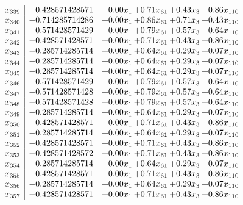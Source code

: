 \documentclass[8pt]{article}
\begin{document}
\[\begin{array}{c| c c@{\hskip 2pt} c@{\hskip 2pt} c@{\hskip 2pt} c@{\hskip 2pt} }
 x_{339}   &  -0.428571428571 & +  0.00 x_{1} & +  0.71 x_{61} & +  0.43 x_{3} & +  0.86 x_{110}\\
 x_{340}   &  -0.714285714286 & +  0.00 x_{1} & +  0.86 x_{61} & +  0.71 x_{3} & +  0.43 x_{110}\\
 x_{341}   &  -0.571428571429 & +  0.00 x_{1} & +  0.79 x_{61} & +  0.57 x_{3} & +  0.64 x_{110}\\
 x_{342}   &  -0.428571428571 & +  0.00 x_{1} & +  0.71 x_{61} & +  0.43 x_{3} & +  0.86 x_{110}\\
 x_{343}   &  -0.285714285714 & +  0.00 x_{1} & +  0.64 x_{61} & +  0.29 x_{3} & +  0.07 x_{110}\\
 x_{344}   &  -0.285714285714 & +  0.00 x_{1} & +  0.64 x_{61} & +  0.29 x_{3} & +  0.07 x_{110}\\
 x_{345}   &  -0.285714285714 & +  0.00 x_{1} & +  0.64 x_{61} & +  0.29 x_{3} & +  0.07 x_{110}\\
 x_{346}   &  -0.571428571429 & +  0.00 x_{1} & +  0.79 x_{61} & +  0.57 x_{3} & +  0.64 x_{110}\\
 x_{347}   &  -0.571428571428 & +  0.00 x_{1} & +  0.79 x_{61} & +  0.57 x_{3} & +  0.64 x_{110}\\
 x_{348}   &  -0.571428571428 & +  0.00 x_{1} & +  0.79 x_{61} & +  0.57 x_{3} & +  0.64 x_{110}\\
 x_{349}   &  -0.285714285714 & +  0.00 x_{1} & +  0.64 x_{61} & +  0.29 x_{3} & +  0.07 x_{110}\\
 x_{350}   &  -0.428571428571 & +  0.00 x_{1} & +  0.71 x_{61} & +  0.43 x_{3} & +  0.86 x_{110}\\
 x_{351}   &  -0.285714285714 & +  0.00 x_{1} & +  0.64 x_{61} & +  0.29 x_{3} & +  0.07 x_{110}\\
 x_{352}   &  -0.428571428571 & +  0.00 x_{1} & +  0.71 x_{61} & +  0.43 x_{3} & +  0.86 x_{110}\\
 x_{353}   &  -0.428571428572 & +  0.00 x_{1} & +  0.71 x_{61} & +  0.43 x_{3} & +  0.86 x_{110}\\
 x_{354}   &  -0.285714285714 & +  0.00 x_{1} & +  0.64 x_{61} & +  0.29 x_{3} & +  0.07 x_{110}\\
 x_{355}   &  -0.428571428571 & +  0.00 x_{1} & +  0.71 x_{61} & +  0.43 x_{3} & +  0.86 x_{110}\\
 x_{356}   &  -0.285714285714 & +  0.00 x_{1} & +  0.64 x_{61} & +  0.29 x_{3} & +  0.07 x_{110}\\
 x_{357}   &  -0.428571428571 & +  0.00 x_{1} & +  0.71 x_{61} & +  0.43 x_{3} & +  0.86 x_{110}\\

\end{array}\]
\end{document}
